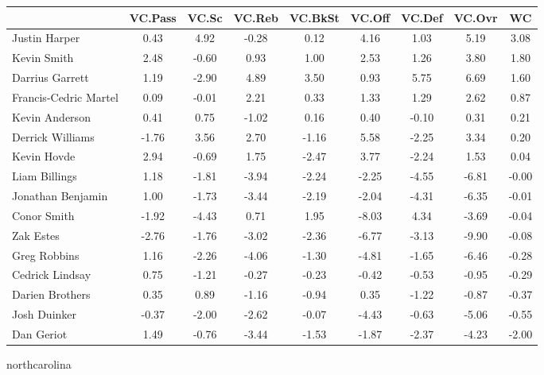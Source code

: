 \documentclass[10pt,letterpaper]{article}
\begin{document}
\begin{table}[ht]
\begin{center}
\begin{tabular}{lcccccccc}
  \hline
 & VC.Pass & VC.Sc & VC.Reb & VC.BkSt & VC.Off & VC.Def & VC.Ovr & WC \\ 
  \hline
Justin Harper & 0.43 & 4.92 & -0.28 & 0.12 & 4.16 & 1.03 & 5.19 & 3.08 \\ 
  Kevin Smith & 2.48 & -0.60 & 0.93 & 1.00 & 2.53 & 1.26 & 3.80 & 1.80 \\ 
  Darrius Garrett & 1.19 & -2.90 & 4.89 & 3.50 & 0.93 & 5.75 & 6.69 & 1.60 \\ 
  Francis-Cedric Martel & 0.09 & -0.01 & 2.21 & 0.33 & 1.33 & 1.29 & 2.62 & 0.87 \\ 
  Kevin Anderson & 0.41 & 0.75 & -1.02 & 0.16 & 0.40 & -0.10 & 0.31 & 0.21 \\ 
  Derrick Williams & -1.76 & 3.56 & 2.70 & -1.16 & 5.58 & -2.25 & 3.34 & 0.20 \\ 
  Kevin Hovde & 2.94 & -0.69 & 1.75 & -2.47 & 3.77 & -2.24 & 1.53 & 0.04 \\ 
  Liam Billings & 1.18 & -1.81 & -3.94 & -2.24 & -2.25 & -4.55 & -6.81 & -0.00 \\ 
  Jonathan Benjamin & 1.00 & -1.73 & -3.44 & -2.19 & -2.04 & -4.31 & -6.35 & -0.01 \\ 
  Conor Smith & -1.92 & -4.43 & 0.71 & 1.95 & -8.03 & 4.34 & -3.69 & -0.04 \\ 
  Zak Estes & -2.76 & -1.76 & -3.02 & -2.36 & -6.77 & -3.13 & -9.90 & -0.08 \\ 
  Greg Robbins & 1.16 & -2.26 & -4.06 & -1.30 & -4.81 & -1.65 & -6.46 & -0.28 \\ 
  Cedrick Lindsay & 0.75 & -1.21 & -0.27 & -0.23 & -0.42 & -0.53 & -0.95 & -0.29 \\ 
  Darien Brothers & 0.35 & 0.89 & -1.16 & -0.94 & 0.35 & -1.22 & -0.87 & -0.37 \\ 
  Josh Duinker & -0.37 & -2.00 & -2.62 & -0.07 & -4.43 & -0.63 & -5.06 & -0.55 \\ 
  Dan Geriot & 1.49 & -0.76 & -3.44 & -1.53 & -1.87 & -2.37 & -4.23 & -2.00 \\ 
   \hline
\end{tabular}
\end{center}
\end{table}
\newpage
\begin{center}
northcarolina 
\end{center}
\end{document}
